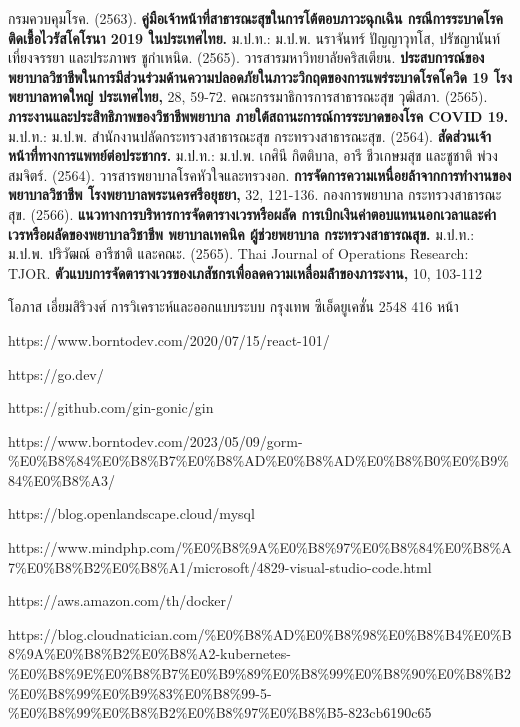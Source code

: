 
\begin{thebibliography}{99}

    กรมควบคุมโรค. (2563). \textbf{คู่มือเจ้าหน้าที่สาธารณะสุขในการโต้ตอบภาวะฉุกเฉิน กรณีการระบาดโรคติดเชื้อไวรัสโคโรนา 2019 ในประเทศไทย.} ม.ป.ท.: ม.ป.พ.
    นราจันทร์ ปัญญาวุทโส, ปรัชญานันท์ เที่ยงจรรยา และประภาพร ชูกำเหนิด. (2565). วารสารมหาวิทยาลัยคริสเตียน. \textbf{ประสบการณ์ของพยาบาลวิชาชีพในการมีส่วนร่วมด้านความปลอดภัยในภาวะวิกฤตของการแพร่ระบาดโรคโควิด 19 โรงพยาบาลหาดใหญ่ ประเทศไทย,} 28, 59-72.
    คณะกรรมาธิการการสาธารณะสุข วุฒิสภา. (2565). \textbf{ภาระงานและประสิทธิภาพของวิชาชีพพยาบาล ภายใต้สถานะการณ์การระบาดของโรค COVID 19.} ม.ป.ท.: ม.ป.พ.
    สำนักงานปลัดกระทรวงสาธารณะสุข กระทรวงสาธารณะสุข. (2564). \textbf{สัดส่วนเจ้าหน้าที่ทางการแพทย์ต่อประชากร.} ม.ป.ท.: ม.ป.พ.
    เกศินี กิตติบาล, อารี ชีวเกษมสุข และชูชาติ พ่วงสมจิตร์. (2564). วารสารพยาบาลโรคหัวใจและทรวงอก. \textbf{การจัดการความเหนื่อยล้าจากการทํางานของพยาบาลวิชาชีพ โรงพยาบาลพระนครศรีอยุธยา,} 32, 121-136.
    กองการพยาบาล กระทรวงสาธารณะสุข. (2566). \textbf{แนวทางการบริหารการจัดตารางเวรหรือผลัด การเบิกเงินค่าตอบแทนนอกเวลาและค่าเวรหรือผลัดของพยาบาลวิชาชีพ พยาบาลเทคนิค ผู้ช่วยพยาบาล กระทรวงสาธารณสุข.} ม.ป.ท.: ม.ป.พ.
    ปริวัฒณ์ อารีชาติ และคณะ. (2565). Thai Journal of Operations Research: TJOR. \textbf{ตัวแบบการจัดตารางเวรของเภสัชกรเพื่อลดความเหลื่อมล้ําของภาระงาน,} 10, 103-112

    โอภาส เอี่ยมสิริวงศ์ การวิเคราะห์และออกแบบระบบ กรุงเทพ ซีเอ็ดยูเคชั่น 2548 416 หน้า
    
    https://www.borntodev.com/2020/07/15/react-101/

    https://go.dev/

    https://github.com/gin-gonic/gin

    https://www.borntodev.com/2023/05/09/gorm-\%E0\%B8\%84\%E0\%B8\%B7\%E0\%B8\%AD\%E0\%B8\%AD\%E0\%B8\%B0\%E0\%B9\%84\%E0\%B8\%A3/


    https://blog.openlandscape.cloud/mysql


    https://www.mindphp.com/\%E0\%B8\%9A\%E0\%B8\%97\%E0\%B8\%84\%E0\%B8\%A7\%E0\%B8\%B2\%E0\%B8\%A1/microsoft/4829-visual-studio-code.html

    https://aws.amazon.com/th/docker/

    https://blog.cloudnatician.com/\%E0\%B8\%AD\%E0\%B8\%98\%E0\%B8\%B4\%E0\%B8\%9A\%E0\%B8\%B2\%E0\%B8\%A2-kubernetes-\%E0\%B8\%9E\%E0\%B8\%B7\%E0\%B9\%89\%E0\%B8\%99\%E0\%B8\%90\%E0\%B8\%B2\%E0\%B8\%99\%E0\%B9\%83\%E0\%B8\%99-5-\%E0\%B8\%99\%E0\%B8\%B2\%E0\%B8\%97\%E0\%B8\%B5-823cb6190c65


\end{thebibliography}
